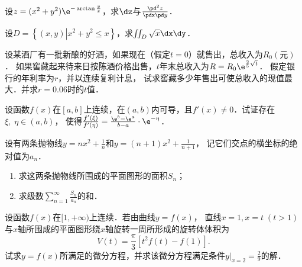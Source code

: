 \documentclass[plain,noanswer,medmath]{../../template/jnuexam}
\begin{document}

\begin{problem}
设$z = (x^2 + y^2)\e^{- \arctan \frac{y}{x}}$，求$\dz$与$\frac{\pd^2 z}{\pdx\pd y}$．
\end{problem}



\begin{problem}
设$D = \left\{\left(x,y \right)\left| x^2 + y^2 \le x \right. \right\}$，求$\iint_D \sqrt{x} \dx\dy$．
\end{problem}



\begin{problem}
设某酒厂有一批新酿的好酒，如果现在（假定$t = 0$）就售出，总收入为$R_0(\text{元})$．
如果窖藏起来待来日按陈酒价格出售，$t$年末总收入为$R = R_0\e^{\frac{2}{5}\sqrt{t}}$．
假定银行的年利率为$r$，并以连续复利计息，
试求窖藏多少年售出可使总收入的现值最大．并求$r = 0.06$时的$t$值．
\end{problem}



\begin{problem}
设函数$f(x)$在$[a,b]$上连续，在$(a,b)$内可导，且$f'(x) \ne 0$．试证存在$\xi,\;\eta\in(a,b)$，
使得$\frac{f'(\xi)}{f'(\eta)} = \frac{\e^b - \e^a}{b - a} \cdot \e^{- \eta}$．
\end{problem}



\begin{problem}
设有两条抛物线$y = nx^2 + \frac{1}{n}$和$y = (n + 1)x^2 + \frac{1}{n + 1}$，
记它们交点的横坐标的绝对值为$a_n$．
\begin{enumerate}
\item 求这两条抛物线所围成的平面图形的面积$S_n$；
\item 求级数$\sum_{n = 1}^{\infty}\frac{S_n}{a_n}$的和．
\end{enumerate}
\end{problem}



\begin{problem}
设函数$f(x)$在$[1, +\infty)$上连续．若由曲线$y = f(x)$，
直线$x = 1,x = t\;(t > 1)$与$x$轴所围成的平面图形绕$x$轴旋转一周所形成的旋转体体积为
$$V(t) = \frac{\pi}{3}\left[t^2 f(t) - f(1) \right].$$
试求$y = f(x)$所满足的微分方程，并求该微分方程满足条件$y\big|_{x = 2} = \frac{2}{9}$的解．
\end{problem}
\end{document}
